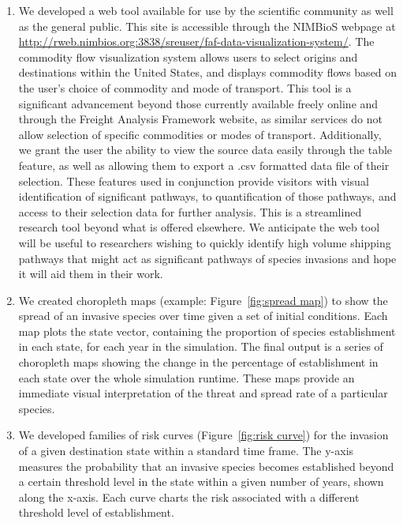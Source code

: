 \documentclass[12pt]{article}
\begin{document}
\begin{enumerate}

\item  We developed a web tool available for use by the scientific community as well as the general public. This site is accessible through the NIMBioS webpage at \url{http://rweb.nimbios.org:3838/sreuser/faf-data-visualization-system/}. The commodity flow visualization system allows users to select origins and destinations within the United States, and displays commodity flows based on the user's choice of commodity and mode of transport. This tool is a significant advancement beyond those currently available freely online and through the Freight Analysis Framework website, as similar services do not allow selection of specific commodities or modes of transport. Additionally, we grant the user the ability to view the source data easily through the table feature, as well as allowing them to export a .csv formatted data file of their selection. These features used in conjunction provide visitors with visual identification of significant pathways, to quantification of those pathways, and access to their selection data for further analysis. This is a streamlined research tool beyond what is offered elsewhere. We anticipate the web tool will be useful to researchers wishing to quickly identify high volume shipping pathways that might act as significant pathways of species invasions and hope it will aid them in their work. 

\item We created choropleth maps (example: Figure~\ref{fig:spread map}) to show the spread of an invasive species over time given a set of initial conditions. Each map plots the state vector, containing the proportion of species establishment in each state, for each year in the simulation. The final output is a series of choropleth maps showing the change in the percentage of establishment in each state over the whole simulation runtime. These maps provide an immediate visual interpretation of the threat and spread rate of a particular species. 

\item We developed families of risk curves (Figure~\ref{fig:risk curve}) for the invasion of a given destination state within a standard time frame. The y-axis measures the probability that an invasive species becomes established beyond a certain threshold level in the state within a given number of years, shown along the x-axis. Each curve charts the risk associated with a different threshold level of establishment.

\end{enumerate}
\end{document}
